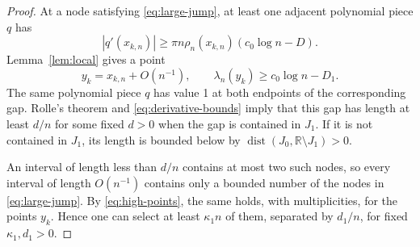 \documentclass[11pt]{article}
\theoremstyle{remark}
\numberwithin{equation}{section}
\begin{document}
\begin{proof}
At a node satisfying \eqref{eq:large-jump}, at least one adjacent polynomial
piece \(q\) has
\[
 |q'(x_{k,n})|\ge\pi n\rho_n(x_{k,n})(c_0\log n-D).
\]
Lemma~\ref{lem:local} gives a point
\begin{equation}\label{eq:high-points}
 y_k=x_{k,n}+O(n^{-1}),\qquad
\lambda_n(y_k)\ge c_0\log n-D_1.
\end{equation}
The same polynomial piece \(q\) has value 1 at both endpoints of the
corresponding gap. Rolle's theorem and
\eqref{eq:derivative-bounds} imply that this gap has length at least \(d/n\)
for some fixed \(d>0\) when the gap is contained in \(J_1\). If it is not
contained in \(J_1\), its length is bounded below by
\(\operatorname{dist}(J_0,\mathbb R\setminus J_1)>0\).

An interval of length less than \(d/n\) contains at most two such nodes, so
every interval of length \(O(n^{-1})\) contains only a bounded number of the
nodes in \eqref{eq:large-jump}. By \eqref{eq:high-points}, the same holds,
with multiplicities, for the points \(y_k\). Hence one can select at least
\(\kappa_1n\) of them, separated by \(d_1/n\), for fixed
\(\kappa_1,d_1>0\).


\end{proof}
\end{document}
